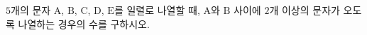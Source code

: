 \hspace*{2mm}\begin{minipage}[t]{\dimexpr\linewidth-2mm\relax}\vspace{0pt}
$5$개의 문자 $\mathrm{A}$, $\mathrm{B}$, $\mathrm{C}$, $\mathrm{D}$, $\mathrm{E}$를 일렬로 나열할 때, $\mathrm{A}$와 $\mathrm{B}$ 사이에 $2$개 이상의 문자가 오도록 나열하는 경우의 수를 구하시오.\end{minipage}
